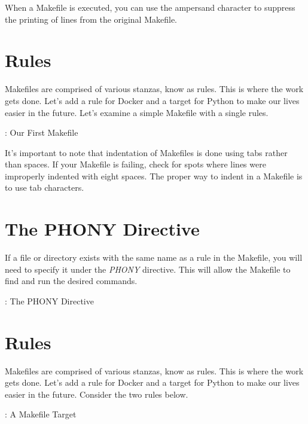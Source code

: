 \justify{}
When a Makefile is executed, you can use the ampersand character to suppress the printing of lines from the original Makefile.

\section{Rules}

\justify{}
Makefiles are comprised of various stanzas, know as rules. This is where the work gets done. Let's add a rule
for Docker and a target for Python to make our lives easier in the future. Let's examine a simple Makefile with a single rules.

\justify{}
\begin{mybox}{\thetcbcounter: Our First Makefile}
	
\end{mybox}

\justify{}
It's important to note that indentation of Makefiles is done using tabs rather than spaces. If your Makefile is failing, check for spots where lines were improperly indented with eight spaces. The proper way to indent in a Makefile is to use tab characters.

\section{The PHONY Directive}

\justify{}
If a file or directory exists with the same name as a rule in the Makefile, you will need to specify
it under the \emph{PHONY} directive. This will allow the Makefile to find and run the desired commands.

\justify{}
\begin{mybox}{\thetcbcounter: The PHONY Directive}
	
\end{mybox}

	
\section{Rules}

\justify{}
Makefiles are comprised of various stanzas, know as rules. This is where the work gets done. Let's add a rule
for Docker and a target for Python to make our lives easier in the future. Consider the two rules below.

\justify{}
\begin{mybox}{\thetcbcounter: A Makefile Target}
	
\end{mybox}

